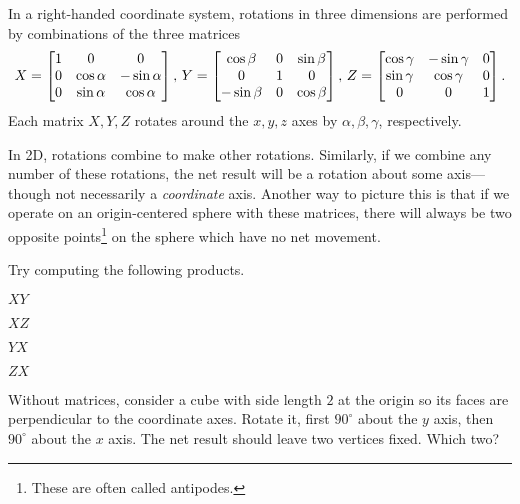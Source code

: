 \documentclass[../gatm_answers.tex]{subfiles}
\begin{document}
\begin{outer_problem}
\item In a right-handed coordinate system, rotations in three dimensions are performed by combinations of the three matrices
$$X=\begin{bmatrix} 1 & 0 & 0 \\ 0 & \cos\alpha & -\sin\alpha \\ 0 & \sin\alpha & \cos\alpha \end{bmatrix},\, Y=\begin{bmatrix} \cos\beta & 0 & \sin\beta \\ 0 & 1 & 0 \\ -\sin\beta & 0 & \cos\beta \end{bmatrix},\, Z=\begin{bmatrix} \cos\gamma & -\sin\gamma & 0 \\ \sin\gamma & \cos\gamma & 0 \\ 0 & 0 & 1 \end{bmatrix}.$$
Each matrix $X,Y,Z$ rotates around the $x,y,z$ axes by $\alpha,\beta,\gamma$, respectively.

In 2D, rotations combine to make other rotations. Similarly, if we combine any number of these rotations, the net result will be a rotation about some axis---though not necessarily a \textit{coordinate} axis. Another way to picture this is that if we operate on an origin-centered sphere with these matrices, there will always be two opposite points\footnote{These are often called antipodes.} on the sphere which have no net movement.

Try computing the following products.
\end{outer_problem}

\begin{inner_problem}[start=1]
\item $XY$
\end{inner_problem}

\begin{inner_problem}
\item $XZ$
\end{inner_problem}

\begin{inner_problem}
\item $YX$
\end{inner_problem}

\begin{inner_problem}
\item $ZX$
\end{inner_problem}

\begin{outer_problem}
\item
\end{outer_problem}

\begin{inner_problem}[start=1]
\item Without matrices, consider a cube with side length $2$ at the origin so its faces are perpendicular to the coordinate axes. Rotate it, first $90^\circ$ about the $y$ axis, then $90^\circ$ about the $x$ axis. The net result should leave two vertices fixed. Which two?
\end{inner_problem}
\end{document}
